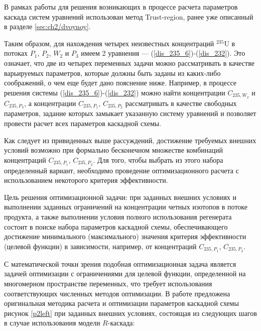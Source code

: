 В рамках работы для решения возникающих в процессе расчета параметров каскада систем уравнений использован метод Trust-region, ранее уже описанный в разделе \ref{sec:ch2/dvoynoy}.

Таким образом, для нахождения четырех неизвестных концентраций $^{235}$U в потоках $P_1$, $P_2$, $W_2$ и $P_3$ имеем 2 уравнения --- (\ref{dis_235_6})-(\ref{dis_232}). Это означает, что две из четырех переменных задачи можно рассматривать в качестве варьируемых параметров, которые должны быть заданы из каких-либо соображений, о чем еще будет дано пояснение ниже. Например, в процессе решения системы (\ref{dis_235_6})-(\ref{dis_232}) можно найти концентрации $C_{235,{W_2}}$ и $C_{235,{P_3}}$, а концентрации $C_{235,{P_1}}$, $C_{235,{P_2}}$ рассматривать в качестве свободных параметров, задание которых замыкает указанную систему уравнений и позволяет провести расчет всех параметров каскадной схемы. 

Как следует из привиденных выше рассуждений, достижение требуемых внешних условий возможно при формально бесконечном множестве комбинаций концентраций $C_{235,{P_1}}$, $C_{235,{P_2}}$. Для того, чтобы выбрать из этого набора определенный вариант, необходимо проведение оптимизационного расчета с использованием некоторого критерия эффективности. 

Цель решения оптимизационной задачи: при заданных внешних условиях и выполнении заданных ограничений на концентрации четных изотопов в потоке продукта, а также выполнении условия полного использования регенерата состоит в поиске набора параметров каскадной схемы, обеспечивающего достижение минимального (максимального) значения критерия эффективности (целевой функции) в зависимости, например, от концентраций $C_{235,{P_1}}$, $C_{235,{P_2}}$.

С математической точки зрения подобная оптимизационная задача является задачей оптимизации с ограничениями для целевой функции, определенной на многомерном пространстве переменных, что требует использования соответствующих численных методов оптимизации. В работе предложена оригинальная методика расчета и оптимизации параметров каскадной схемы рисунок \ref{p2left} при заданных внешних условиях, состоящая из следующих шагов в случае использования модели $R$-каскада:


